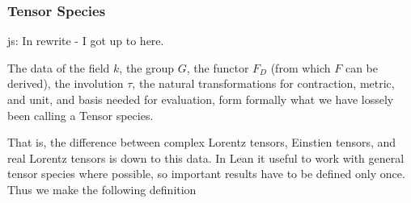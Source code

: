 \documentclass[a4paper, 11pt]{article}
\newcommand{\js}[1]{ {\color{magenta} js:  #1}}
\begin{document}
\subsubsection{Tensor Species} \label{sec:tensorSpecies}

\js{In rewrite - I got up to here.}

The data of the field $k$, the group $G$, the functor $F_D$ (from which $F$ can be derived), the involution $\tau$, the natural
transformations for contraction, metric, and unit, and basis needed for evaluation, 
form formally what we have lossely been calling a Tensor species.

That is, the difference between complex Lorentz tensors, Einstien tensors, and real Lorentz tensors 
is down to this data. 
In Lean it useful to work with general tensor species where possible, so important results have 
to be defined only once. Thus we make the following definition 
\end{document}
